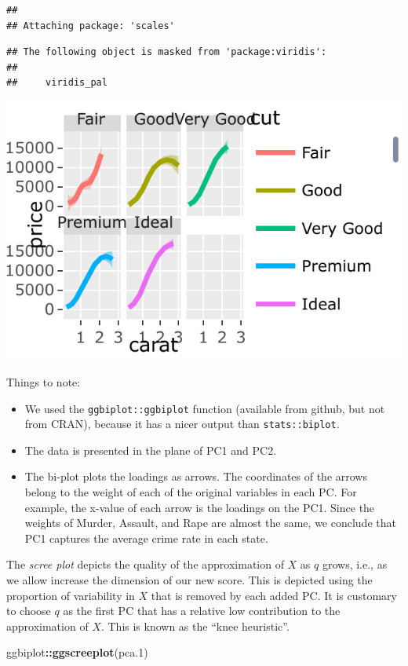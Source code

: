 \documentclass[]{book}
\newenvironment{Shaded}{\begin{snugshade}}{\end{snugshade}}
\newcommand{\FloatTok}[1]{\textcolor[rgb]{0.00,0.00,0.81}{#1}}
\newcommand{\KeywordTok}[1]{\textcolor[rgb]{0.13,0.29,0.53}{\textbf{#1}}}
\newcommand{\NormalTok}[1]{#1}
\newcommand{\OperatorTok}[1]{\textcolor[rgb]{0.81,0.36,0.00}{\textbf{#1}}}
\providecommand{\tightlist}{%
  \setlength{\itemsep}{0pt}\setlength{\parskip}{0pt}}
\theoremstyle{definition}
\theoremstyle{definition}
\theoremstyle{definition}
\theoremstyle{remark}
\begin{document}
\begin{verbatim}
## 
## Attaching package: 'scales'
\end{verbatim}

\begin{verbatim}
## The following object is masked from 'package:viridis':
## 
##     viridis_pal
\end{verbatim}

\includegraphics[width=0.5\linewidth]{Rcourse_files/figure-latex/unnamed-chunk-252-1}

Things to note:

\begin{itemize}
\tightlist
\item
  We used the \texttt{ggbiplot::ggbiplot} function (available from github, but not from CRAN), because it has a nicer output than \texttt{stats::biplot}.
\item
  The data is presented in the plane of PC1 and PC2.
\item
  The bi-plot plots the loadings as arrows. The coordinates of the arrows belong to the weight of each of the original variables in each PC.
  For example, the x-value of each arrow is the loadings on the PC1.
  Since the weights of Murder, Assault, and Rape are almost the same, we conclude that PC1 captures the average crime rate in each state.
\end{itemize}

The \emph{scree plot} depicts the quality of the approximation of \(X\) as \(q\) grows, i.e., as we allow increase the dimension of our new score.
This is depicted using the proportion of variability in \(X\) that is removed by each added PC.
It is customary to choose \(q\) as the first PC that has a relative low contribution to the approximation of \(X\).
This is known as the ``knee heuristic''.

\begin{Shaded}
\begin{Highlighting}[]
\NormalTok{ggbiplot}\OperatorTok{::}\KeywordTok{ggscreeplot}\NormalTok{(pca}\FloatTok{.1}\NormalTok{)}
\end{Highlighting}
\end{Shaded}
\end{document}
